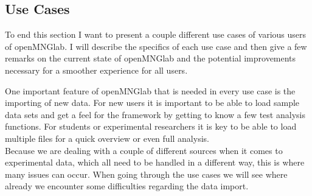 \subsection{Use Cases}
To end this section I want to present a couple different use cases of various users of openMNGlab. I will describe the specifics of each use case and then give a few remarks on the current state of openMNGlab and the potential improvements necessary for a smoother experience for all users.

One important feature of openMNGlab that is needed in every use case is the importing of new data. For new users it is important to be able to load sample data sets and get a feel for the framework by getting to know a few test analysis functions. For students or experimental researchers it is key to be able to load multiple files for a quick overview or even full analysis.\\
Because we are dealing with a couple of different sources when it comes to experimental data, which all need to be handled in a different way, this is where many issues can occur. When going through the use cases we will see where already we encounter some difficulties regarding the data import.


